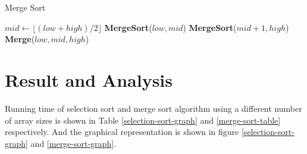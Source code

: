 \documentclass[twocolumn]{article}
\begin{document}
\begin{algorithm}
    \caption{Merge Sort}
    \begin{algorithmic}[1]
        \State $mid \gets \lfloor (low+high)/2 \rfloor$
        \State \textbf{MergeSort}($low, mid$)
        \State \textbf{MergeSort}($mid+1, high$)
        \State \textbf{Merge}($low, mid, high$)
        \EndIf
        \EndProcedure
    \end{algorithmic}
\end{algorithm}

\section*{Result and Analysis}
Running time of selection sort and merge sort algorithm using a different number of array sizes is
shown in Table \ref{selection-sort-graph} and \ref{merge-sort-table} respectively. And the graphical representation is shown in figure \ref{selection-sort-graph} and \ref{merge-sort-graph}.
\end{document}

